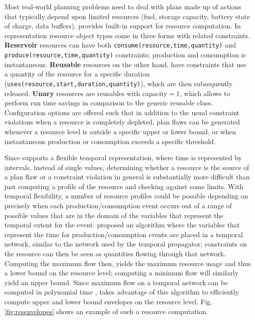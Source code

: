 Most real-world planning problems need to deal with plans made up of
actions that typically depend upon limited resources (\eg fuel,
storage capacity, battery state of charge, data buffers).  \eu
provides built-in support for resource computation. In \eus
representation resource object types come in three forms with related
constraints. \textbf{Reservoir} resources can have both
\texttt{consume(resource,time,quantity)} and
\texttt{produce(resource,time,quantity)} constraints; production and
consumption is instantaneous. \textbf{Reusable} resources on the other
hand, have constraints that use a quantity of the resource for a
specific duration (\texttt{uses(resource,start,duration,quantity)}),
which are then subsequently released. \textbf {Unary} resources are
reusables with capacity$ = 1$, which allows \eu to perform run time
savings in comparison to the generic reusable class. Configuration
options are offered such that in addition to the usual constraint
violations when a resource is completely depleted, plan flaws can be
generated whenever a resource level is outside a specific upper or
lower bound, or when instantaneous production or consumption exceeds a
specific threshold.

Since \eu supports a flexible temporal representation, where time is
represented by intervals, instead of single values, determining
whether a resource is the source of a plan flaw or a constraint
violation in general is substantially more difficult than just
computing a profile of the resource and checking against some limits.
With temporal flexibility, a number of resource profiles could be
possible depending on precisely when each production/consumption event
occurs out of a range of possible values that are in the domain of the
variables that represent the temporal extent for the event.
\cite{Muscettola04,Muscettola06} proposed an algorithm where the
variables that represent the time for production/consumption events
are placed in a temporal network, similar to the network used by the
temporal propagator; constraints on the resource can then be seen as
quantities flowing through that network. Computing the maximum flow
then, yields the maximum resource usage and thus a lower bound on the
resource level; computing a minimum flow will similarly yield an upper
bound. Since maximum flow on a temporal network can be computed in
polynomial time , \eu takes advantage of
this algorithm to efficiently compute upper and lower bound envelopes
on the resource level. Fig. \ref{fig:resenvelopes} shows an example of
such a resource computation.

